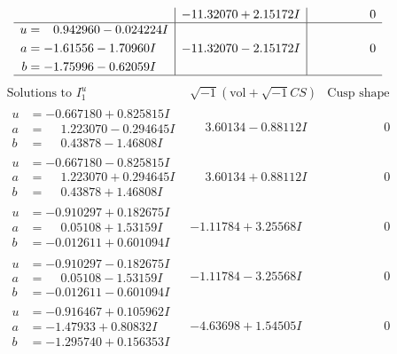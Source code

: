 \documentclass[1p]{elsarticle_modified}
\theoremstyle{definition}
\newcommand{\I}{\sqrt{-1}}
\begin{document}
$$\begin{array}{c|c|c}
 & -11.32070 + 2.15172 I & \phantom{-0.000000 } 0 \\ \hline\begin{aligned}
u &= \phantom{-}0.942960 - 0.024224 I \\
a &= -1.61556 - 1.70960 I \\
b &= -1.75996 - 0.62059 I\end{aligned}
 & -11.32070 - 2.15172 I & \phantom{-0.000000 } 0\\
 \hline 
 \end{array}$$\newpage$$\begin{array}{c|c|c}  
\text{Solutions to }I^u_{1}& \I (\text{vol} + \sqrt{-1}CS) & \text{Cusp shape}\\
 \hline 
\begin{aligned}
u &= -0.667180 + 0.825815 I \\
a &= \phantom{-}1.223070 - 0.294645 I \\
b &= \phantom{-}0.43878 - 1.46808 I\end{aligned}
 & \phantom{-}3.60134 - 0.88112 I & \phantom{-0.000000 } 0 \\ \hline\begin{aligned}
u &= -0.667180 - 0.825815 I \\
a &= \phantom{-}1.223070 + 0.294645 I \\
b &= \phantom{-}0.43878 + 1.46808 I\end{aligned}
 & \phantom{-}3.60134 + 0.88112 I & \phantom{-0.000000 } 0 \\ \hline\begin{aligned}
u &= -0.910297 + 0.182675 I \\
a &= \phantom{-}0.05108 + 1.53159 I \\
b &= -0.012611 + 0.601094 I\end{aligned}
 & -1.11784 + 3.25568 I & \phantom{-0.000000 } 0 \\ \hline\begin{aligned}
u &= -0.910297 - 0.182675 I \\
a &= \phantom{-}0.05108 - 1.53159 I \\
b &= -0.012611 - 0.601094 I\end{aligned}
 & -1.11784 - 3.25568 I & \phantom{-0.000000 } 0 \\ \hline\begin{aligned}
u &= -0.916467 + 0.105962 I \\
a &= -1.47933 + 0.80832 I \\
b &= -1.295740 + 0.156353 I\end{aligned}
 & -4.63698 + 1.54505 I & \phantom{-0.000000 } 0 \\ \hline\begin{aligned}

\end{aligned}
\end{array}$$
\end{document}
